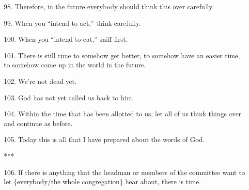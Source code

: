 98. Therefore, in the future everybody should think this over carefully.

99. When you ``intend to act,'' think carefully.

100. When you ``intend to eat,'' sniff first.

101. There is still time to somehow get better, to somehow have an easier time,
to somehow come up in the world in the future.

102. We're not dead yet.

103. God has not yet called us back to him.

104. Within the time that has been allotted to us, let all of us think things over
and continue as before.

105. Today this is all that I have prepared about the words of God.

***

106. If there is anything that the headman or members of the committee want to
let \{everybody/the whole congregation\} hear about, there is time.

